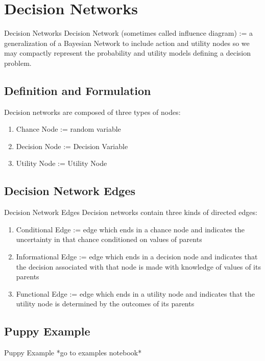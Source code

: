 \documentclass{beamer}
\begin{document}
\section{Decision Networks}
\begin{frame}{Decision Networks}
Decision Network (sometimes called influence diagram) := a generalization of a Bayesian Network to include action and utility nodes so we may compactly represent the probability and utility models defining a decision problem. 

\subsection{Definition and Formulation}
Decision networks are composed of three types of nodes:
\begin{enumerate}[i]
    \item Chance Node := random variable
    \item Decision Node := Decision Variable
    \item Utility Node := Utility Node
\end{enumerate}
\end{frame}

\subsection{Decision Network Edges}
\begin{frame}{Decision Network Edges}
Decision networks contain three kinds of directed edges:
\begin{enumerate}[i]
    \item Conditional Edge := edge which ends in a chance node and indicates the uncertainty in that chance conditioned on values of parents
    \item Informational Edge := edge which ends in a decision node and indicates that the decision associated with that node is made with knowledge of values of its parents 
    \item Functional Edge := edge which ends in a utility node and indicates that the utility node is determined by the outcomes of its parents
\end{enumerate}
\end{frame}

\subsection{Puppy Example}
\begin{frame}{Puppy Example}
*go to examples notebook*
    
\end{frame}
\end{document}
